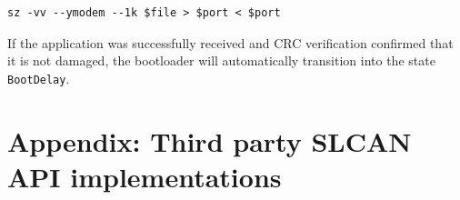 \documentclass{zubaxdoc}
\begin{document}
\begin{verbatim}
sz -vv --ymodem --1k $file > $port < $port
\end{verbatim}

If the application was successfully received and CRC verification confirmed that it is not damaged, the bootloader will automatically transition into the state \texttt{BootDelay}.

%
%
\appendix
\chapter{Appendix: Third party SLCAN API implementations}\label{appendix:slcan_api_overview}
\end{document}
